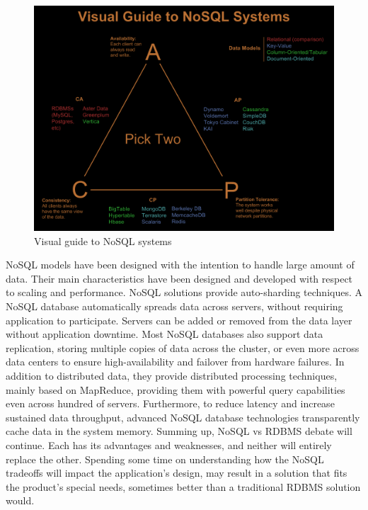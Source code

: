 \begin{figure}[htbp]
  \begin{center}
    \includegraphics[width=1.0\maxwidth]{../figures/nosql_dbs.png}
    \caption{Visual guide to NoSQL systems\label{fig:nosql_dbs}}
   \end{center}
\end{figure}

NoSQL models have been designed with the intention to handle large amount of
data. Their main characteristics have been designed and developed
with respect to scaling and performance.
NoSQL solutions provide auto-sharding techniques. A NoSQL database automatically
spreads data across servers, without requiring application to participate.
Servers can be added or removed from the data layer without application
downtime. Most NoSQL databases also support data replication, storing multiple
copies of data across the cluster, or even more across data centers to ensure
high-availability and failover from hardware failures. In addition to
distributed data, they provide distributed processing techniques, mainly based on
MapReduce, providing them with powerful query capabilities even across hundred of
servers. Furthermore, to reduce latency and increase sustained data throughput,
advanced NoSQL database technologies transparently cache data in the system memory.
Summing up, NoSQL vs RDBMS debate will continue. Each has its advantages and
weaknesses, and neither will entirely replace the other. Spending some time on
understanding how the NoSQL tradeoffs will impact the application's design, may
result in a solution that fits the product's special needs, sometimes better
than a traditional RDBMS solution would.
